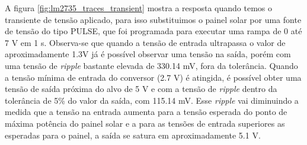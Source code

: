\noindent
\begin{minipage}{\linewidth}
\label{fig:lm2735_transient}
\end{minipage}

\noindent
\begin{minipage}{\linewidth}
\label{fig:lm2735_traces_transient}
\end{minipage}

A figura \ref{fig:lm2735_traces_transient} mostra a resposta quando temos o transiente de tensão aplicado, para isso substituimos o painel solar por uma fonte de tensão do tipo PULSE, que foi programada para executar uma rampa de 0 até 7 V em 1 s. Observa-se que quando a tensão de entrada ultrapassa o valor de aproximadamente 1.3V já é possível observar uma tensão na saída, porém com uma tensão de \textit{ripple} bastante elevada de 330.14 mV, fora da tolerância. Quando a tensão mínima de entrada do conversor (2.7 V) é atingida, é possível obter uma tensão de saída próxima do alvo de 5 V e com a tensão de \textit{ripple} dentro da tolerância de 5\% do valor da saída, com 115.14 mV. Esse \textit{ripple} vai diminuindo a medida que a tensão na entrada aumenta para a tensão esperada do ponto de máxima potência do painel solar e a para as tensões de entrada superiores as esperadas para o painel, a saída se satura em aproximadamente 5.1 V.

